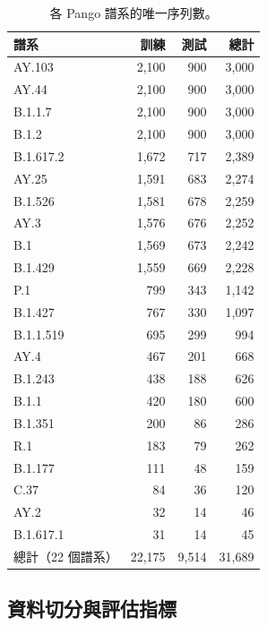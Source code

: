\documentclass[10pt,a4paper]{article}
\begin{document}
\begin{table}[ht]
    \centering
    \caption{各 Pango 譜系的唯一序列數。}
    \label{tab:lineage-frequency}
    \footnotesize
    \setlength{\tabcolsep}{4pt}
    \renewcommand{\arraystretch}{1.05}
    \begin{tabular*}{0.62\textwidth}{@{\extracolsep{\fill}}lrrr@{}}
        \toprule
        譜系 & 訓練 & 測試 & 總計 \\
        \midrule
        AY.103    & 2,100 & 900 & 3,000 \\
        AY.44     & 2,100 & 900 & 3,000 \\
        B.1.1.7   & 2,100 & 900 & 3,000 \\
        B.1.2     & 2,100 & 900 & 3,000 \\
        B.1.617.2 & 1,672 & 717 & 2,389 \\
        AY.25     & 1,591 & 683 & 2,274 \\
        B.1.526   & 1,581 & 678 & 2,259 \\
        AY.3      & 1,576 & 676 & 2,252 \\
        B.1       & 1,569 & 673 & 2,242 \\
        B.1.429   & 1,559 & 669 & 2,228 \\
        P.1       & 799 & 343 & 1,142 \\
        B.1.427   & 767 & 330 & 1,097 \\
        B.1.1.519 & 695 & 299 & 994 \\
        AY.4      & 467 & 201 & 668 \\
        B.1.243   & 438 & 188 & 626 \\
        B.1.1     & 420 & 180 & 600 \\
        B.1.351   & 200 & 86 & 286 \\
        R.1       & 183 & 79 & 262 \\
        B.1.177   & 111 & 48 & 159 \\
        C.37      & 84 & 36 & 120 \\
        AY.2      & 32 & 14 & 46 \\
        B.1.617.1 & 31 & 14 & 45 \\
        \midrule
        總計（22 個譜系） & 22,175 & 9,514 & 31,689 \\
        \bottomrule
    \end{tabular*}
\end{table}

\subsection{資料切分與評估指標}
\label{sec:metrics}
\end{document}

